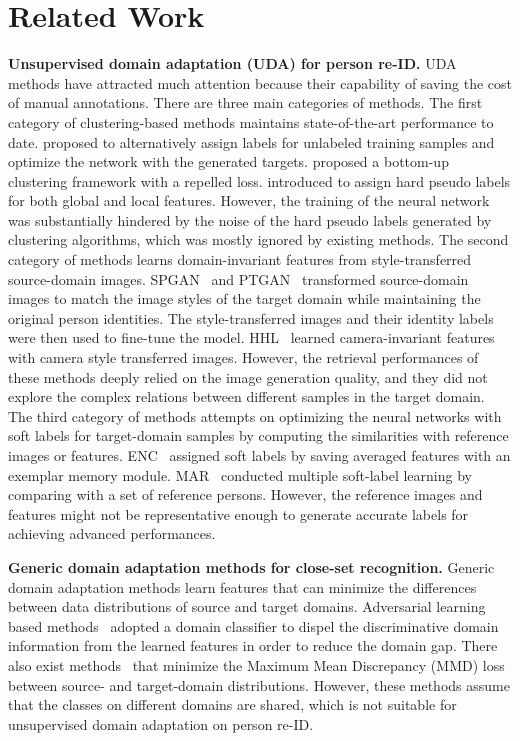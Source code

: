 \documentclass{article} \usepackage{iclr2020_conference,times}
\begin{document}
\section{Related Work}
\noindent\textbf{Unsupervised domain adaptation (UDA) for person re-ID.}
UDA methods have attracted much attention because their capability of saving the cost of manual annotations.
There are three main categories of methods. 
The first category of clustering-based methods maintains state-of-the-art performance to date.
\citep{fan2018unsupervised} proposed to alternatively assign labels for unlabeled training samples and optimize the network with the generated targets.
\citep{lin2019aBottom} proposed a bottom-up clustering framework with a repelled loss. 
\citep{yang2019selfsimilarity} introduced to assign hard pseudo labels for both global and local features.
However,
the training of the neural network was substantially hindered by the noise of the hard pseudo labels generated by clustering algorithms, which was mostly ignored by existing methods.
The second category of methods learns domain-invariant features from style-transferred source-domain images.
SPGAN~\citep{deng2018image} and PTGAN~\citep{wei2018person}
transformed source-domain images to match the image styles of the target domain while maintaining the original person identities. The style-transferred images and their identity labels were then used to fine-tune the model.
HHL~\citep{zhong2018generalizing} 
learned camera-invariant features with camera style transferred images.
However, the retrieval performances of these methods deeply relied on the image generation quality, and they did not explore the complex relations between different samples in the target domain.
The third category of methods attempts on optimizing the neural networks with soft labels for target-domain samples by computing the similarities with reference images or features.
ENC~\citep{zhong2019invariance} assigned soft labels by saving averaged features with an exemplar memory module.
MAR~\citep{yu2019unsupervised} conducted multiple soft-label learning by comparing with a set of reference persons.
However, the reference images and features might not be representative enough to generate accurate labels for achieving advanced performances.


\noindent\textbf{Generic domain adaptation methods for close-set recognition.}
Generic domain adaptation methods 
learn features that can minimize the differences between data distributions of source and target domains.
Adversarial learning based methods~\citep{zhang2018collaborative,tzeng2017adversarial,ghifary2016deep,bousmalis2016domain,tzeng2015simultaneous} adopted a domain classifier to dispel the discriminative domain information from the learned features in order to reduce the domain gap.
There also exist methods~\citep{tzeng2014deep,long2015learning,yan2017mind,saito2018maximum,ghifary2016deep} that minimize the Maximum Mean Discrepancy (MMD) loss between source- and target-domain distributions.
However, these methods assume that the classes on different domains are shared, which is not suitable for unsupervised domain adaptation on person re-ID.
\end{document}
